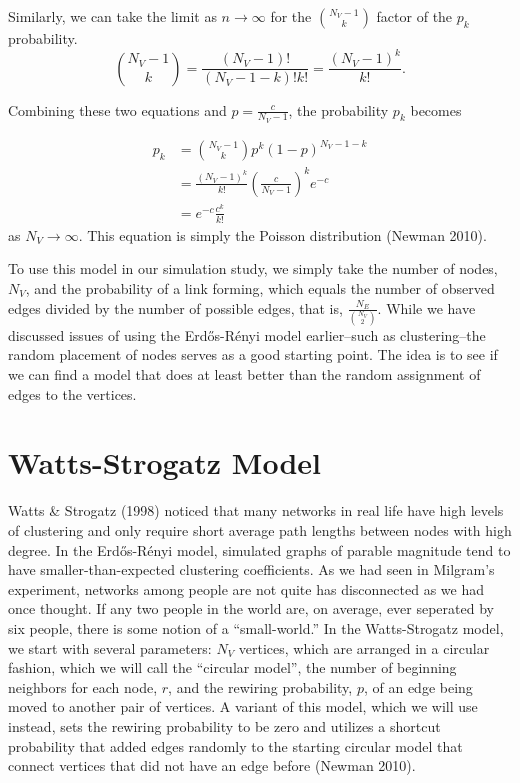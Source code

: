 \documentclass[12pt,twoside]{amherstthesis}
\begin{document}
  Similarly, we can take the limit as \(n \to \infty\) for the
  \({N_{V} - 1 \choose k}\) factor of the \(p_k\) probability.
  \[{N_{V} - 1 \choose k} = \frac {(N_{V} - 1)!} {(N_{V} - 1 - k)!k!} = \frac {(N_{V} - 1)^{k}} {k!}.\]
  
  Combining these two equations and \(p = \frac {c} {N_{V} - 1}\), the
  probability \(p_{k}\) becomes
  
  \[
  \begin{aligned}
  p_{k} &= {N_{V} -1 \choose k}p^{k}(1 - p)^{N_{V} - 1 - k} \\
  &= \frac {(N_{V} - 1)^{k}} {k!}\left(\frac {c} {N_{V} - 1}\right)^{k}e^{-c} \\
  &= e^{-c} \frac{c^{k}} {k!}
  \end{aligned}
  \] as \(N_{V} \to \infty\). This equation is simply the Poisson
  distribution (Newman 2010).
  
  To use this model in our simulation study, we simply take the number of
  nodes, \(N_{V}\), and the probability of a link forming, which equals
  the number of observed edges divided by the number of possible edges,
  that is, \(\frac{N_{E}} {{N_{V} \choose 2}}\). While we have discussed
  issues of using the Erdős-Rényi model earlier--such as clustering--the
  random placement of nodes serves as a good starting point. The idea is
  to see if we can find a model that does at least better than the random
  assignment of edges to the vertices.
  
  \section{Watts-Strogatz Model}\label{watts-strogatz-model}
  
  Watts \& Strogatz (1998) noticed that many networks in real life have
  high levels of clustering and only require short average path lengths
  between nodes with high degree. In the Erdős-Rényi model, simulated
  graphs of parable magnitude tend to have smaller-than-expected
  clustering coefficients. As we had seen in Milgram's experiment,
  networks among people are not quite has disconnected as we had once
  thought. If any two people in the world are, on average, ever seperated
  by six people, there is some notion of a ``small-world.'' In the
  Watts-Strogatz model, we start with several parameters: \(N_V\)
  vertices, which are arranged in a circular fashion, which we will call
  the ``circular model'', the number of beginning neighbors for each node,
  \(r\), and the rewiring probability, \(p\), of an edge being moved to
  another pair of vertices. A variant of this model, which we will use
  instead, sets the rewiring probability to be zero and utilizes a
  shortcut probability that added edges randomly to the starting circular
  model that connect vertices that did not have an edge before (Newman
  2010).
  
\end{document}

